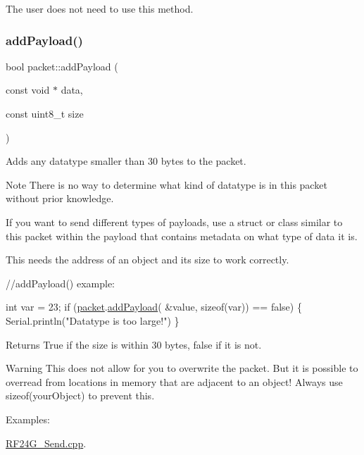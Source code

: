 The user does not need to use this method. \hypertarget{classpacket_af40fdcda00a1371c60e9e4444df0c13f}{}\label{classpacket_af40fdcda00a1371c60e9e4444df0c13f} 
\subsubsection{\texorpdfstring{add\+Payload()}{addPayload()}}
{\footnotesize\ttfamily bool packet\+::add\+Payload (\begin{DoxyParamCaption}\item[{const void $\ast$}]{data,  }\item[{const uint8\+\_\+t}]{size }\end{DoxyParamCaption})}

Adds any datatype smaller than 30 bytes to the packet. \begin{DoxyNote}{Note}
There is no way to determine what kind of datatype is in this packet without prior knowledge. 

If you want to send different types of payloads, use a struct or class similar to this packet within the payload that contains metadata on what type of data it is.
\end{DoxyNote}
This needs the address of an object and it\textquotesingle{}s size to work correctly. 
\begin{DoxyCode}
\textcolor{comment}{//addPayload() example:}

     \textcolor{keywordtype}{int} var = 23;
     \textcolor{keywordflow}{if} (\hyperlink{classpacket}{packet}.\hyperlink{classpacket_af40fdcda00a1371c60e9e4444df0c13f}{addPayload}( &value, \textcolor{keyword}{sizeof}(var)) == \textcolor{keyword}{false}) \{
         Serial.println(\textcolor{stringliteral}{"Datatype is too large!"})
     \}
\end{DoxyCode}


\begin{DoxyReturn}{Returns}
True if the size is within 30 bytes, false if it is not.
\end{DoxyReturn}
\begin{DoxyWarning}{Warning}
This does not allow for you to overwrite the packet. But it is possible to overread from locations in memory that are adjacent to an object! Always use sizeof(your\+Object) to prevent this. 
\end{DoxyWarning}
\begin{Desc}
\item[Examples\+: ]\par
\hyperlink{_r_f24_g__send_8cpp-example}{R\+F24\+G\+\_\+\+Send.\+cpp}.\end{Desc}
\hypertarget{classpacket_a6d50c91a97477e0de8ff0d3a23341f73}{}\label{classpacket_a6d50c91a97477e0de8ff0d3a23341f73} 
